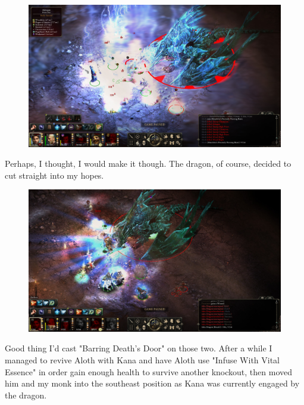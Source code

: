 \documentclass{article}
\begin{document}
\begin{figure}
\includegraphics[scale=0.33]{files/blog/2019_03_17_pillars_of_eternity_path_of_the_damned_act_iv/2019_03_17_dragon1_05.jpg}
\end{figure}

Perhaps, I thought, I would make it though.  The dragon, of course, decided to cut straight into my hopes.

\begin{figure}
\includegraphics[scale=0.33]{files/blog/2019_03_17_pillars_of_eternity_path_of_the_damned_act_iv/2019_03_17_dragon1_06.jpg}
\end{figure}

Good thing I'd cast "Barring Death's Door" on those two.  After a while I managed to revive Aloth with Kana and have Aloth use "Infuse With Vital Essence" in order gain enough health to survive another knockout, then moved him and my monk into the southeast position as Kana was currently engaged by the dragon.
\end{document}
